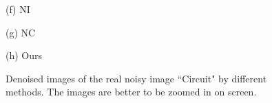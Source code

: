 \documentclass[10pt,onecolumn,letterpaper]{article}
\begin{document}
\begin{figure}
{\begin{minipage}[t]{0.244\textwidth}
{\footnotesize (f) NI \cite{neatimage}  }
\end{minipage}
\begin{minipage}[t]{0.244\textwidth}
\centering
{}
{\footnotesize (g) NC \cite{noiseclinic,ncwebsite}   }
\end{minipage}
\begin{minipage}[t]{0.244\textwidth}
\centering
{}
{\footnotesize (h) Ours  }
\end{minipage}
}
\vspace{-2mm}
\caption{Denoised images of the real noisy image ``Circuit" \cite{ncwebsite} by different methods. The images are better to be zoomed in on screen.}
\label{fig2}
\end{figure}
\end{document}

